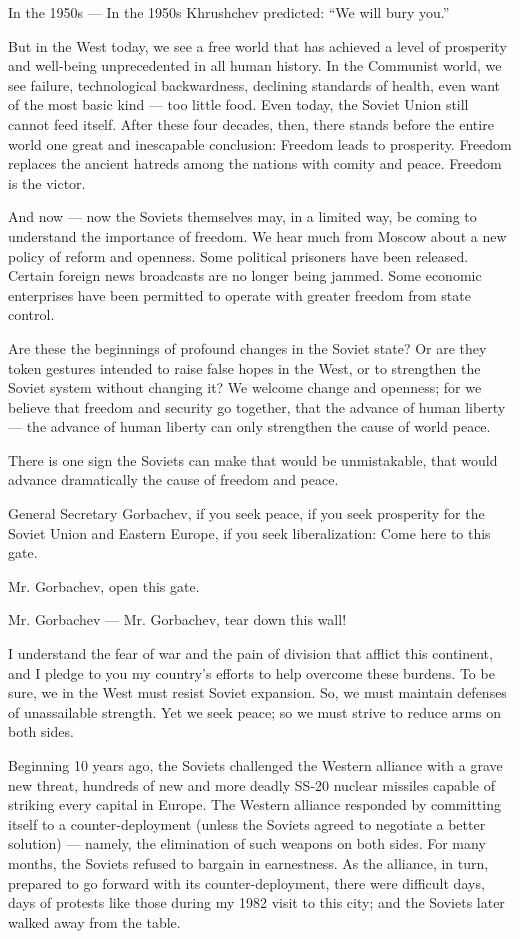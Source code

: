 \documentclass[a4paper]{amsbook}
\begin{document}
In the 1950s — In the 1950s Khrushchev predicted: “We will bury you.”

But in the West today, we see a free world that has achieved a level of prosperity and well-being unprecedented in all human history. In the Communist world, we see failure, technological backwardness, declining standards of health, even want of the most basic kind — too little food. Even today, the Soviet Union still cannot feed itself. After these four decades, then, there stands before the entire world one great and inescapable conclusion: Freedom leads to prosperity. Freedom replaces the ancient hatreds among the nations with comity and peace. Freedom is the victor.

And now — now the Soviets themselves may, in a limited way, be coming to understand the importance of freedom. We hear much from Moscow about a new policy of reform and openness. Some political prisoners have been released. Certain foreign news broadcasts are no longer being jammed. Some economic enterprises have been permitted to operate with greater freedom from state control.

Are these the beginnings of profound changes in the Soviet state? Or are they token gestures intended to raise false hopes in the West, or to strengthen the Soviet system without changing it? We welcome change and openness; for we believe that freedom and security go together, that the advance of human liberty — the advance of human liberty can only strengthen the cause of world peace.

There is one sign the Soviets can make that would be unmistakable, that would advance dramatically the cause of freedom and peace.

General Secretary Gorbachev, if you seek peace, if you seek prosperity for the Soviet Union and Eastern Europe, if you seek liberalization: Come here to this gate.

Mr. Gorbachev, open this gate.

Mr. Gorbachev — Mr. Gorbachev, tear down this wall!

I understand the fear of war and the pain of division that afflict this continent, and I pledge to you my country's efforts to help overcome these burdens. To be sure, we in the West must resist Soviet expansion. So, we must maintain defenses of unassailable strength. Yet we seek peace; so we must strive to reduce arms on both sides.

Beginning 10 years ago, the Soviets challenged the Western alliance with a grave new threat, hundreds of new and more deadly SS-20 nuclear missiles capable of striking every capital in Europe. The Western alliance responded by committing itself to a counter-deployment (unless the Soviets agreed to negotiate a better solution) — namely, the elimination of such weapons on both sides. For many months, the Soviets refused to bargain in earnestness. As the alliance, in turn, prepared to go forward with its counter-deployment, there were difficult days, days of protests like those during my 1982 visit to this city; and the Soviets later walked away from the table.
\end{document}
